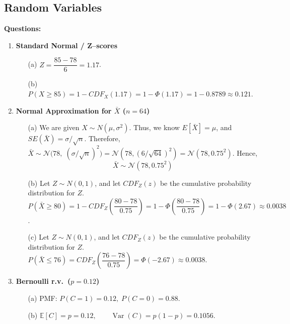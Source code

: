 \documentclass{article}
\begin{document}
\subsection{Random Variables}

\textbf{Questions:}

\begin{enumerate}
\item \textbf{Standard Normal / Z–scores}
      \begin{enumerate}
        \item[(a)] \(Z=\dfrac{85-78}{6}=1.17\).
        \item[(b)] \(P(X\ge 85)=1-CDF_X(1.17)=1-\Phi(1.17)=1-0.8789\approx 0.121\).
      \end{enumerate}

\item \textbf{Normal Approximation for \(\bar X\) (\(n=64\))}
      \begin{enumerate}
        \item[(a)] We are given $X\sim N(\mu, \sigma^2)$. Thus, we know $E[\bar X ] = \mu$, and $SE(\bar X )= \sigma / \sqrt{n}$. \newline Therefore, \(\bar X\sim\mathcal N\!\bigl(78,\;(\sigma/\sqrt n)^2\bigr)=\mathcal N(78,(6/\sqrt{64})^2)=\mathcal N(78,0.75^2)\). Hence,
        $$\bar X \sim \mathcal N(78,0.75^2) $$
        \item[(b)] Let $Z \sim N(0,1)$, and let $CDF_Z(z)$ be the cumulative probability distribution for $Z$. \(P(\bar X\ge 80)
                    = 1 - CDF_Z\left(\dfrac{80-78}{0.75}\right)
                    = 1-\Phi\!\left(\dfrac{80-78}{0.75}\right)
                    = 1-\Phi(2.67)\approx 0.0038\).
        \item[(c)] Let $Z \sim N(0,1)$, and let $CDF_Z(z)$ be the cumulative probability distribution for $Z$. \(P(\bar X\le 76)=CDF_Z\left(\dfrac{76-78}{0.75}\right)=\Phi(-2.67)\approx 0.0038\).
      \end{enumerate}

\item \textbf{Bernoulli r.v.\ (\(p=0.12\))}
      \begin{enumerate}
        \item[(a)] PMF:\; \(P(C=1)=0.12,\;P(C=0)=0.88\).
        \item[(b)] \(\mathbb E[C]=p=0.12,\qquad\operatorname{Var}(C)=p(1-p)=0.1056\).
      \end{enumerate}


\end{enumerate}
\end{document}
